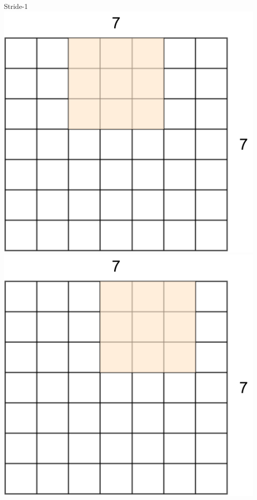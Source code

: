 \documentclass[default, aspectratio=169]{beamer}
\begin{document}
\begin{frame}{Stride-1}
		\includegraphics[keepaspectratio, scale=0.13]{pic/Stride3.png}
		\includegraphics[keepaspectratio, scale=0.13]{pic/Stride4.png}

\end{frame}
\end{document}
